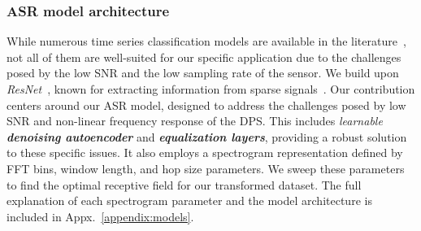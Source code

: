 \subsubsection{\textbf{ASR model architecture}} 
While numerous time series classification models are available in the literature~\cite{ts1, ts2, ts3}, not all of them are well-suited for our specific application due to the challenges posed by the low SNR and the low sampling rate of the sensor. 
We build upon \textit{ResNet}~\cite{resnet, audioresnet}, known for extracting information from sparse signals~\cite{receptivefields}.
Our contribution centers around our ASR model, designed to address the challenges posed by low SNR and non-linear frequency response of the DPS. This  includes \textit{learnable} \textbf{\textit{denoising autoencoder}} and \textbf{\textit{equalization layers}}, providing a robust solution to these specific issues.
It also employs a spectrogram representation defined by FFT bins, window length, and hop size parameters. 
We sweep these parameters to find the optimal receptive field for our transformed dataset. 
The full explanation of each spectrogram parameter and the model architecture is included in Appx.~\ref{appendix:models}. 
